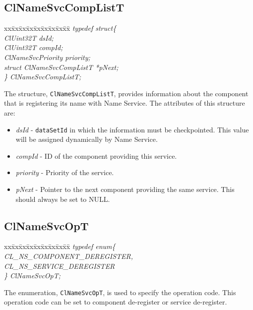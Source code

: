 \begin{flushleft}
\subsection{ClNameSvcCompListT}
\begin{tabbing}
xx\=xx\=xx\=xx\=xx\=xx\=xx\=xx\=xx\=\kill
\textit{typedef struct\{}\\
\>\>\>\>\textit{ClUint32T               dsId;}\\
\>\>\>\>\textit{ClUint32T               compId;}\\
\>\>\>\>\textit{ClNameSvcPriority priority;}\\
\>\>\>\>\textit{struct   ClNameSvcCompListT  *pNext;}\\        
\textit{\} ClNameSvcCompListT;}\end{tabbing}                  
The structure, {\tt{ClNameSvcCompListT}}, provides information about the component that is registering its name with Name Service. The attributes of this
structure are:
\begin{itemize}
\item
\textit{dsId} - {\tt{dataSetId}} in which the information must be checkpointed. This value will be assigned dynamically by Name Service.
\item
\textit{compId} - ID of the component providing this service. 
\item
\textit{priority} - Priority of the service.
\item
\textit{pNext} - Pointer to the next component providing the same service. This should always be set to NULL. 
\end{itemize}


\subsection{ClNameSvcOpT}
\begin{tabbing}
xx\=xx\=xx\=xx\=xx\=xx\=xx\=xx\=xx\=\kill
\textit{typedef enum\{}\\
\>\>\>\>\textit{CL\_NS\_COMPONENT\_DEREGISTER,}\\
\>\>\>\>\textit{CL\_NS\_SERVICE\_DEREGISTER}\\
\textit{\} ClNameSvcOpT;}  \end{tabbing}                                  
The enumeration, {\tt{ClNameSvcOpT}}, is used to specify the operation code. This operation code can be set to component de-register or service de-register.




\end{flushleft}
